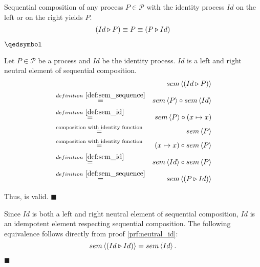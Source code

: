 

\begin{theorem}
\label{thm:idempotence_identity}
Sequential composition of any process $P \in \mathcal{P}$ with the identity process $Id$ on the left or on the right yields $P$.
\begin{equation*}
  \left( Id \triangleright P \right) \equiv P \equiv \left( P \triangleright Id \right)
\end{equation*}

\vspace*{-0.75em}
\hfill$\qedsymbol$
\end{theorem}

\begin{myproof}
\label{prf:neutral_id}
Let $P \in \mathcal{P}$ be a process and $Id$ be the identity process. $Id$ is a left and right neutral element of sequential composition.
\begin{eqnarray*}
  & & \sem{\sequence{Id}{P}} \\
    & \overset{\defref{def:sem_sequence}}{=} & \sem{P} \circ \sem{Id} \\
    & \overset{\defref{def:sem_id}}{=} & \sem{P} \circ \left( x \mapsto x \right) \\
    & \overset{\text{composition with identity function}}{=} & \sem{P} \\
    & \overset{\text{composition with identity function}}{=} & \left( x \mapsto x \right) \circ \sem{P} \\
    & \overset{\defref{def:sem_id}}{=} & \sem{Id} \circ \sem{P} \\
    & \overset{\defref{def:sem_sequence}}{=} & \sem{\sequence{P}{Id}} \\
\end{eqnarray*}

\vspace*{-2em}
Thus,  is valid. \hfill$\blacksquare$
\end{myproof}

\clearpage

\begin{corollary}
Since $Id$ is both a left and right neutral element of sequential composition, $Id$ is an idempotent element respecting sequential composition. The following equivalence follows directly from proof \ref{prf:neutral_id}:
\begin{equation*}
  sem \left\langle \left( Id \triangleright Id \right) \right\rangle = sem \left\langle Id \right\rangle.
\end{equation*}

\hfill$\blacksquare$
\end{corollary}


